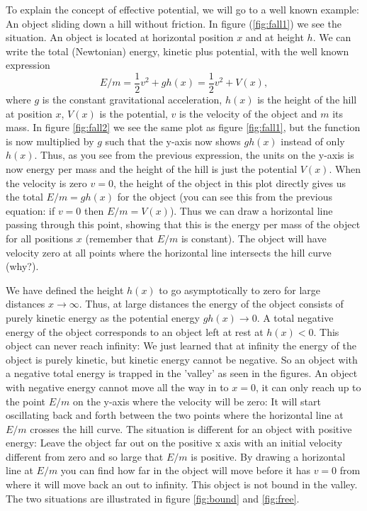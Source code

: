 {\begin{multicols}{2}
To explain the concept of effective potential, we will go to a well known example: An object sliding down a hill without friction. In figure (\ref{fig:fall1}) we see the situation. An object is located at horizontal position $x$ and at height $h$. We can write the total (Newtonian) energy, kinetic plus potential, with the well known expression
\[
E/m=\frac{1}{2}v^2+gh(x)=\frac{1}{2}v^2+V(x),
\]
where $g$ is the constant gravitational acceleration, $h(x)$ is the height of the hill at position $x$,  $V(x)$ is the potential, $v$ is the velocity of the object and $m$ its mass. In figure \ref{fig:fall2} we see the same plot as figure \ref{fig:fall1}, but the function is now multiplied by $g$ such that the y-axis now shows $gh(x)$ instead of only $h(x)$. Thus, as you see from the previous expression, the units on the y-axis is now energy per mass and the height of the hill is just the potential $V(x)$. When the velocity is zero $v=0$, the height of the object in this plot directly gives us the total $E/m=gh(x)$ for the object (you can see this from the previous equation: if $v=0$ then $E/m=V(x)$). Thus we can draw a horizontal line passing through this point, showing that this is the energy per mass of the object for all positions $x$ (remember that $E/m$ is constant). The object will have velocity zero at all points where the horizontal line intersects the hill curve (why?).

We have defined the height $h(x)$ to go asymptotically to zero for large distances $x\rightarrow\infty$. Thus, at large distances the energy of the object consists of purely kinetic energy as the potential energy $gh(x)\rightarrow0$. A total negative energy of the object corresponds to an object left at rest at $h(x)<0$. This object can never reach infinity: We just learned that at infinity the energy of the object is purely kinetic, but kinetic energy cannot be negative. So an object with a negative total energy is trapped in the 'valley' as seen in the figures. An object with negative energy cannot move all the way in to $x=0$, it can only reach up to the point $E/m$ on the y-axis where the velocity will be zero: It will start oscillating back and forth between the two points where the horizontal line at $E/m$ crosses the hill curve. The situation is different for an object with positive energy: Leave the object far out on the positive x axis with an initial velocity different from zero and so large that $E/m$ is positive. By drawing a horizontal line at $E/m$ you can find how far in the object will move before it has $v=0$ from where it will move back an out to infinity. This object is not bound in the valley. The two situations are illustrated in figure \ref{fig:bound} and \ref{fig:free}.


\end{multicols}}
